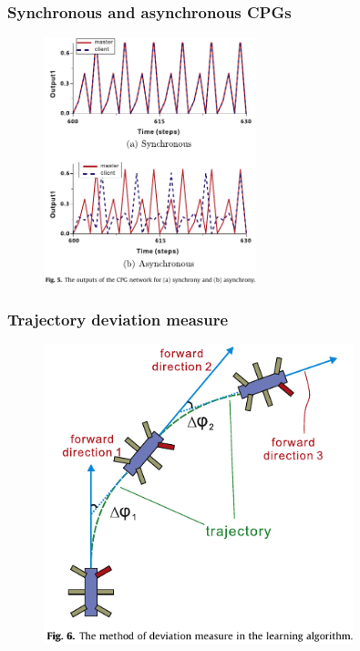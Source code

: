 \documentclass{beamer}
\begin{document}
\begin{frame}
\frametitle{Synchronous and asynchronous CPGs}
    \vspace*{-0.5cm}
\begin{figure}
\center
\includegraphics[width=0.55\textwidth]{figs/synchrony-asynchrony.pdf}
\end{figure}
\end{frame}

\begin{frame}
\frametitle{Trajectory deviation measure}
\begin{figure}
\center
\includegraphics[width=0.8\textwidth]{figs/deviation-measure.pdf}
\end{figure}
\end{frame}
\end{document}
